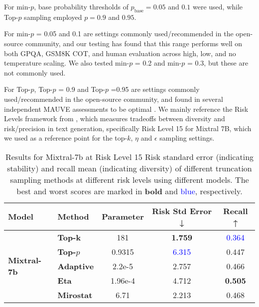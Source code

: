\documentclass{article}
\begin{document}
For min-\( p \), base probability thresholds of \( p_{\text{base}} = 0.05 \) and \( 0.1 \) were used, while Top-\(p\) sampling employed \( p = 0.9 \) and \( 0.95 \).

For min-\( p \) = 0.05 and 0.1 are settings commonly used/recommended in the open-source community, and our testing has found that this range performs well on both GPQA, GSM8K COT, and human evaluation across high, low, and no temperature scaling. We also tested min-\( p \) = 0.2 and min-\( p \) = 0.3, but these are not commonly used.

For Top-\(p\), Top-\(p\) = 0.9 and Top-\(p\) =0.95 are settings commonly used/recommended in the open-source community, and found in several independent MAUVE assessments to be optimal \citep{hewitt-etal-2022-truncation, zhu2024improvingopenendedtextgeneration}. We mainly reference the Risk Levels framework from \cite{zhou2024balancingdiversityriskllm}, which measures tradeoffs between diversity and risk/precision in text generation, specifically Risk Level 15 for Mixtral 7B, which we used as a reference point for the top-$k$, \(\eta\) and \(\epsilon\) sampling settings.

\begin{table}[ht]
\centering
\begin{tabular}{|l|l|c|c|c|}
\hline
\textbf{Model} & \textbf{Method} & \textbf{Parameter} & \textbf{Risk Std Error ↓} & \textbf{Recall ↑} \\
\hline
\multirow{5}{*}{\textbf{Mixtral-7b}} & \textbf{Top-k}     & 181   & \textbf{1.759}  & \textcolor{blue}{0.364} \\
                                     & \textbf{Top-\(p\)}     & 0.9315 & \textcolor{blue}{6.315}  & 0.447 \\
                                     & \textbf{Adaptive}  & 2.2e-5 & 2.757 & 0.466 \\
                                     & \textbf{Eta}       & 1.96e-4 & 4.712 & \textbf{0.505} \\
                                     & \textbf{Mirostat}  & 6.71   & 2.213 & 0.468 \\
\hline
\end{tabular}
\caption{Results for Mixtral-7b at Risk Level 15 \citep{zhou2024balancingdiversityriskllm} Risk standard error (indicating stability) and recall mean (indicating diversity) of different truncation sampling methods at different risk levels using different models. The best and worst scores are marked in \textbf{bold} and \textcolor{blue}{blue}, respectively.}
\end{table}
\end{document}
